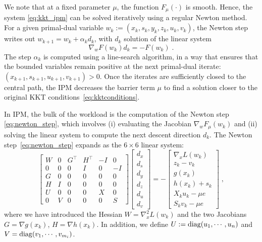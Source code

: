 We note that at a fixed parameter $\mu$, the function $F_\mu(\cdot)$
is smooth. Hence, the system \eqref{eq:kkt_ipm} can be solved iteratively
using a regular Newton method. For a given primal-dual variable
$w_k := (x_k, s_k, y_k, z_k, u_k, v_k)$, the Newton step writes out
$w_{k+1} = w_k + \alpha_k d_k$, with $d_k$ solution of the linear system
\begin{equation}
  \label{eq:newton_step}
  \nabla_w F(w_k) d_k = -F(w_k) \; .
\end{equation}
The step $\alpha_k$ is computed using a line-search algorithm, in a way
that ensures that the bounded variables remain positive
at the next primal-dual iterate: $(x_{k+1}, s_{k+1}, u_{k+1}, v_{k+1}) > 0$.
Once the iterates are sufficiently closed to the central path,
the IPM decreases the barrier term $\mu$ to find a solution closer to
the original KKT conditions~\eqref{eq:kktconditions}.

In IPM, the bulk of the workload is the computation of the Newton
step \eqref{eq:newton_step}, which involves (i) evaluating the Jacobian
$\nabla_w F_\mu(w_k)$ and (ii) solving the linear system to compute
the next descent direction $d_k$.
The Newton step~\eqref{eq:newton_step} expands as the $6 \times 6$ linear system:
\begin{equation}
  \label{eq:kkt:unreduced}
  \tag{$K_3$}
  \begin{bmatrix}
    W & 0 & G^\top & H^\top & -I & 0 \\
    0 & 0 & 0 & I & 0 & -I \\
    G & 0 & 0 & 0 & 0 & 0 \\
    H & I & 0 & 0 & 0 & 0 \\
    U & 0 & 0 & 0 & X & 0 \\
    0 & V & 0 & 0 & 0 & S
  \end{bmatrix}
  \begin{bmatrix}
    d_x \\
    d_s \\
    d_y \\
    d_z \\
    d_u \\
    d_v
  \end{bmatrix}
  = - \begin{bmatrix}
    \nabla_x L(w_k) \\
       z_k - v_k  \\
       g(x_k)  \\
       h(x_k) + s_k  \\
       X_k u_k - \mu e  \\
       S_k v_k - \mu e
  \end{bmatrix} \; ,
\end{equation}
where we have introduced the Hessian $W = \nabla^2_x L(w_k)$ and
the two Jacobians $G = \nabla g(x_k)$, $H = \nabla h(x_k)$.
In addition, we define $U := \operatorname{diag}(u_1, \cdots, u_n)$
and $V = \operatorname{diag}(v_1, \cdots, v_{m_i})$.

